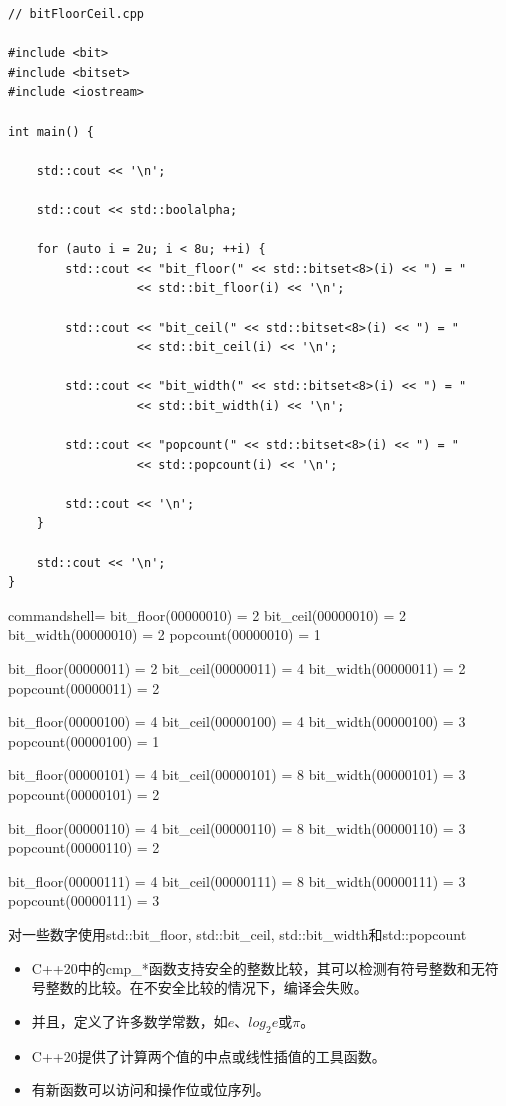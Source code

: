 \begin{lstlisting}[style=styleCXX]
// bitFloorCeil.cpp

#include <bit>
#include <bitset>
#include <iostream>

int main() {
	
	std::cout << '\n';
	
	std::cout << std::boolalpha;
	
	for (auto i = 2u; i < 8u; ++i) {
		std::cout << "bit_floor(" << std::bitset<8>(i) << ") = "
		          << std::bit_floor(i) << '\n';
		
		std::cout << "bit_ceil(" << std::bitset<8>(i) << ") = "
		          << std::bit_ceil(i) << '\n';
		
		std::cout << "bit_width(" << std::bitset<8>(i) << ") = "
		          << std::bit_width(i) << '\n';
		
		std::cout << "popcount(" << std::bitset<8>(i) << ") = "
		          << std::popcount(i) << '\n';
		
		std::cout << '\n';
	}

	std::cout << '\n';
}
\end{lstlisting}

\begin{tcblisting}{commandshell={}}
bit_floor(00000010) = 2
bit_ceil(00000010) = 2
bit_width(00000010) = 2
popcount(00000010) = 1

bit_floor(00000011) = 2
bit_ceil(00000011) = 4
bit_width(00000011) = 2
popcount(00000011) = 2

bit_floor(00000100) = 4
bit_ceil(00000100) = 4
bit_width(00000100) = 3
popcount(00000100) = 1

bit_floor(00000101) = 4
bit_ceil(00000101) = 8
bit_width(00000101) = 3
popcount(00000101) = 2

bit_floor(00000110) = 4
bit_ceil(00000110) = 8
bit_width(00000110) = 3
popcount(00000110) = 2

bit_floor(00000111) = 4
bit_ceil(00000111) = 8
bit_width(00000111) = 3
popcount(00000111) = 3
\end{tcblisting}

\begin{center}
对一些数字使用std::bit\_floor, std::bit\_ceil, std::bit\_width和std::popcount
\end{center}

\begin{tcolorbox}[breakable,enhanced jigsaw,colback=mygreen!5!white,colframe=mygreen!75!black,title={总结}]
	
\begin{itemize}
\item 
C++20中的cmp\_*函数支持安全的整数比较，其可以检测有符号整数和无符号整数的比较。在不安全比较的情况下，编译会失败。

\item 
并且，定义了许多数学常数，如$e$、$log_2e$或$\pi$。

\item 
C++20提供了计算两个值的中点或线性插值的工具函数。

\item 
有新函数可以访问和操作位或位序列。
\end{itemize}
	
\end{tcolorbox}
\newpage